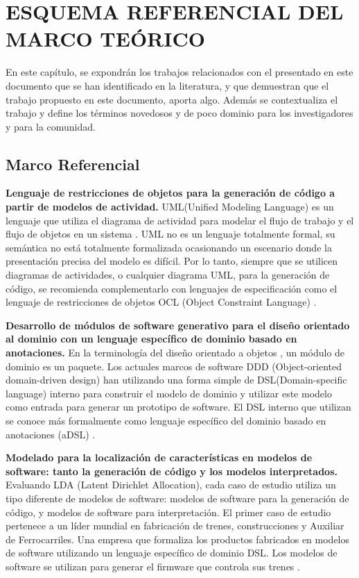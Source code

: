 \documentclass[12pt,a4paper,final]{article}
\begin{document}
	
	\section{ESQUEMA REFERENCIAL DEL MARCO TEÓRICO}
	
	En este capítulo, se expondrán los trabajos relacionados con el presentado en este documento que se han identificado en la literatura, y que demuestran que el trabajo propuesto en este documento, aporta algo. Además se contextualiza el trabajo y define los términos novedosos y de poco dominio para los investigadores y para la comunidad.
	
	\subsection{Marco Referencial}
	
	\textbf{Lenguaje de restricciones de objetos para la generación de código
	a partir de modelos de actividad.} UML(Unified Modeling Language) es un lenguaje que utiliza el diagrama de actividad para modelar el flujo de trabajo y el flujo de objetos en un sistema \cite{Improving}. UML no es un lenguaje totalmente formal, su semántica no está totalmente formalizada ocasionando un escenario donde la presentación precisa del modelo es difícil. Por lo tanto, siempre que se utilicen diagramas de actividades, o cualquier diagrama UML, para la generación de código, se recomienda complementarlo con lenguajes de especificación como el lenguaje de restricciones de objetos OCL (Object Constraint Language) \cite{Object}.   

	\textbf{Desarrollo de módulos de software generativo para el diseño orientado al dominio con un lenguaje específico de dominio basado en anotaciones. }En la terminología del diseño orientado a objetos \cite{Feature}, un módulo de dominio es un paquete. Los actuales marcos de software DDD (Object-oriented domain-driven design) han utilizando una forma simple de DSL(Domain-specific language) interno para construir el modelo de dominio y utilizar este modelo como entrada para generar un prototipo de software. El DSL interno que utilizan se conoce más formalmente como lenguaje específico del dominio basado en anotaciones (aDSL) \cite{Generative}. 
	
	\textbf{Modelado para la localización de características en modelos de software: tanto la generación de código y los modelos interpretados. }Evaluando LDA (Latent Dirichlet Allocation), cada caso de estudio utiliza un tipo diferente de modelos de software: modelos de software para la generación de código, y modelos de software para interpretación. El primer caso de estudio pertenece a un líder mundial en fabricación de trenes, construcciones y Auxiliar de Ferrocarriles. Una empresa que formaliza los productos fabricados en modelos de software utilizando un lenguaje específico de dominio DSL. Los modelos de software se utilizan para generar el firmware que controla sus trenes \cite{Topic}. 
	
\end{document}
